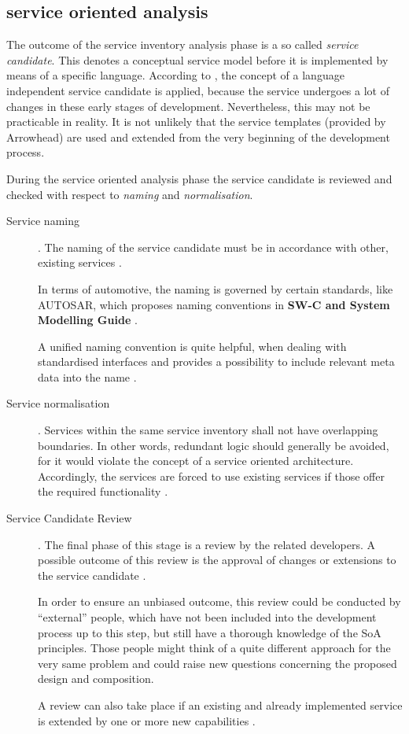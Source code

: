 \subsection{service oriented analysis}

The outcome of the service inventory analysis phase is a so called \emph{service candidate}. This denotes a conceptual service model before it is implemented by means of a specific language. According to \cite[p.42]{erl2011}, the concept of a language independent service candidate is applied, because the service undergoes a lot of changes in these early stages of development. Nevertheless, this may not be practicable in reality. It is not unlikely that the service templates (provided by Arrowhead) are used and extended from the very beginning of the development process.

During the service oriented analysis phase the service candidate is reviewed and checked with respect to \emph{naming} and \emph{normalisation}.

\begin{description}
	\item [Service naming] .
	The naming of the service candidate must be in accordance with other, existing services \cite[p.206]{erl2011}.

	In terms of automotive, the naming is governed by certain standards, like AUTOSAR, which proposes naming conventions in \textbf{SW-C and System Modelling Guide} \cite{autosar_system_modelling}.

	A unified naming convention is quite helpful, when dealing with standardised interfaces and provides a possibility to include relevant meta data into the name \cite{rehner2013}.

	\item [Service normalisation] .
	Services within the same service inventory shall not have overlapping boundaries. In other words, redundant logic should generally be avoided, for it would violate the concept of a service oriented architecture. Accordingly, the services are forced to use existing services if those offer the required functionality \cite[p.207]{erl2011}.

	\item [Service Candidate Review] .
	The final phase of this stage is a review by the related developers. A possible outcome of this review is the approval of changes or extensions to the service candidate \cite[p.210]{erl2011}.

	In order to ensure an unbiased outcome, this review could be conducted by ``external'' people, which have not been included into the development process up to this step, but still have a thorough knowledge of the SoA principles. Those people might think of a quite different approach for the very same problem and could raise new questions concerning the proposed design and composition.

	A review can also take place if an existing and already implemented service is extended by one or more new capabilities \cite[p.210]{erl2011}.
\end{description}




